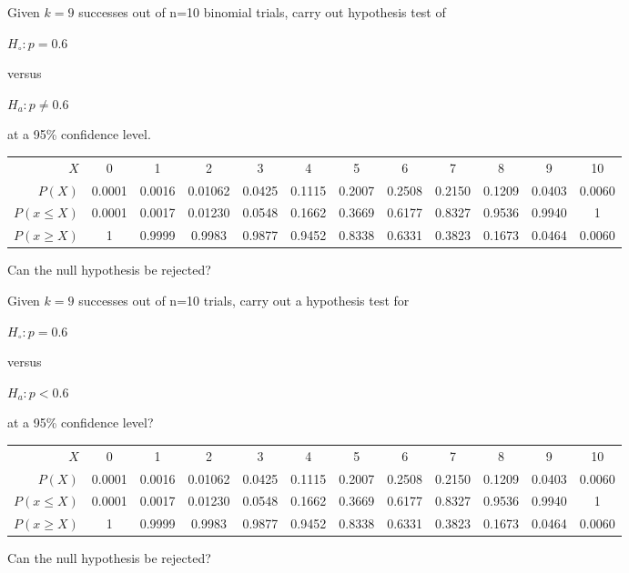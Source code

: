 \documentclass{article}
\begin{document}
\vspace{1cm}

\noindent\begin{minipage}{\linewidth}
Given $k=9$ successes out of n=10 binomial trials, carry out hypothesis test of\medskip

\( H_\circ: p=0.6\)\medskip

versus\medskip

\( H_a: p \neq 0.6\)\medskip

at a 95\% confidence level.\medskip

\begin{tabular}{r|ccccccccccc}
  $X$ & 0 & 1 & 2 & 3 & 4 & 5 & 6 & 7 & 8 & 9 & 10 \\
  $P(X)$ & 0.0001 & 0.0016 & 0.01062 & 0.0425 & 0.1115 & 0.2007 &
  0.2508 & 0.2150 & 0.1209 & 0.0403 & 0.0060 \\
  $P(x \leq X)$ & 0.0001 & 0.0017 & 0.01230 & 0.0548 & 0.1662 &
  0.3669 & 0.6177 & 0.8327 & 0.9536 & 0.9940 & 1 \\
  $P(x \geq X)$ & 1 & 0.9999 & 0.9983 & 0.9877 & 0.9452 &
  0.8338 & 0.6331 & 0.3823 & 0.1673 & 0.0464 & 0.0060
\end{tabular}\medskip

Can the null hypothesis be rejected?
\end{minipage}

\vspace{1cm}

\noindent\begin{minipage}{\linewidth}
Given $k=9$ successes out of n=10 trials, carry out a hypothesis test for\medskip

\( H_\circ: p=0.6\)\medskip

versus\medskip

\( H_a: p<0.6\)\medskip

at a 95\% confidence level?\medskip

\begin{tabular}{r|ccccccccccc}
  $X$ & 0 & 1 & 2 & 3 & 4 & 5 & 6 & 7 & 8 & 9 & 10 \\
  $P(X)$ & 0.0001 & 0.0016 & 0.01062 & 0.0425 & 0.1115 & 0.2007 &
  0.2508 & 0.2150 & 0.1209 & 0.0403 & 0.0060 \\
  $P(x \leq X)$ & 0.0001 & 0.0017 & 0.01230 & 0.0548 & 0.1662 &
  0.3669 & 0.6177 & 0.8327 & 0.9536 & 0.9940 & 1 \\
  $P(x \geq X)$ & 1 & 0.9999 & 0.9983 & 0.9877 & 0.9452 &
  0.8338 & 0.6331 & 0.3823 & 0.1673 & 0.0464 & 0.0060
\end{tabular}\medskip

Can the null hypothesis be rejected?
\end{minipage}
\end{document}
